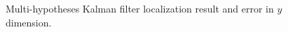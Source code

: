 \begin{figure}[!htbp]
  \centering
    \begin{subfigure}[b]{0.9\textwidth}
      
    \end{subfigure}
    \begin{subfigure}[b]{0.9\textwidth}
      
    \end{subfigure}
  \caption{Multi-hypotheses Kalman filter localization result and error in $y$ dimension.}
 \label{fig:benchmarkKalman1}
\end{figure}

